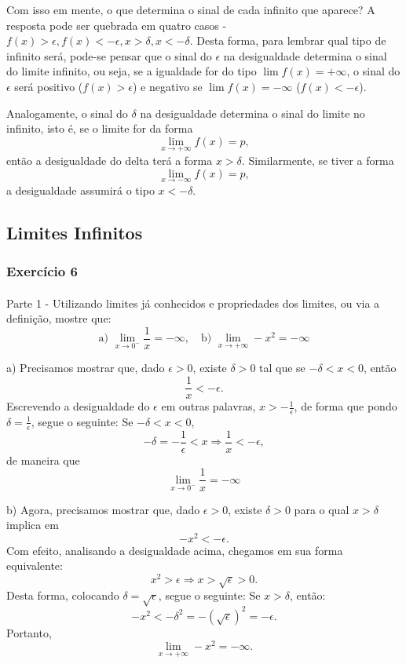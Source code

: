 \documentclass[exercícios_de_cálculo.tex]{subfiles}
\begin{document}
Com isso em mente, o que determina o sinal de cada infinito que aparece? A resposta pode ser quebrada em quatro casos - $f(x) > \epsilon, f(x) < -\epsilon, x > \delta, x < -\delta$. Desta forma, para lembrar qual tipo de infinito será, pode-se pensar que o sinal do $\epsilon$ na desigualdade determina o sinal do limite infinito, ou seja, se a igualdade for do tipo $\lim f(x) = +\infty$, o sinal do $\epsilon$ será positivo ($f(x) > \epsilon$) e negativo se $\lim f(x) = -\infty$ ($f(x) < -\epsilon$).

Analogamente, o sinal do $\delta$ na desigualdade determina o sinal do limite no infinito, isto é, se o limite for da forma
$$
	\lim_{x\to+\infty} f(x) = p,
$$
então a desigualdade do delta terá a forma $x > \delta$. Similarmente, se tiver a forma
$$
	\lim_{x\to-\infty} f(x) = p,
$$
a desigualdade assumirá o tipo $x < -\delta.$

\subsection{Limites Infinitos}
\subsubsection{Exercício 6}
\paragraph{}Parte 1 - Utilizando limites já conhecidos e propriedades dos limites, ou via a definição, mostre que:
$$
	\text{a) }\lim_{x\to{0^{-}}}{\frac{1}{x}} = -\infty, \quad \text{b) }\lim_{x\to+\infty} -x^2 = -\infty
$$
\begin{sol*}
	a) Precisamos mostrar que, dado $\epsilon > 0$, existe $\delta > 0$ tal que se $-\delta < x < 0$, então
	$$
		\frac{1}{x} < -\epsilon.
	$$
	Escrevendo a desigualdade do $\epsilon$ em outras palavras, $x > -\frac{1}{\epsilon}$, de forma que pondo $\delta = \frac{1}{\epsilon}$, segue o seguinte: Se $-\delta < x < 0$,
	$$
		-\delta  = -\frac{1}{\epsilon} < x \Rightarrow \frac{1}{x} < -\epsilon,
	$$
	de maneira que
	$$
		\lim_{x\to{0^{-}}}{\frac{1}{x}} = -\infty
	$$

	b) Agora, precisamos mostrar que, dado $\epsilon > 0$, existe $\delta > 0$ para o qual $x > \delta$ implica em
	$$
		-x^2 < -\epsilon.
	$$
	Com efeito, analisando a desigualdade acima, chegamos em sua forma equivalente:
	$$
		x^2 > \epsilon\Rightarrow x > \sqrt{\epsilon} > 0.
	$$
	Desta forma, colocando $\delta = \sqrt{\epsilon}$, segue o seguinte: Se $x > \delta$, então:
	$$
		-x^2 < -\delta^2 = -(\sqrt{\epsilon})^2 = -\epsilon.
	$$
	Portanto,
	$$
		\lim_{x\to+\infty} -x^2 = -\infty.
	$$
	\qedsymbol
\end{sol*}
\end{document}

